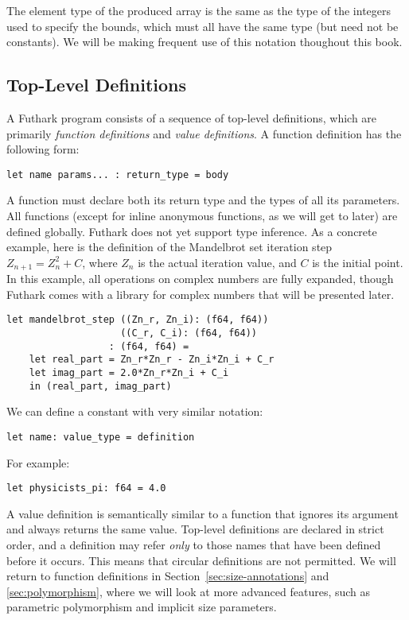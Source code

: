 \documentclass[oneside,11pt]{book}
\begin{document}
The element type of the produced array is the same as the type of the
integers used to specify the bounds, which must all have the same type
(but need not be constants).  We will be making frequent use of this
notation thoughout this book.

\subsection{Top-Level Definitions}
\label{sec:function-declarations}

A Futhark program consists of a sequence of top-level definitions,
which are primarily \textit{function definitions} and \textit{value
  definitions}.  A function definition has the following form:

\begin{lstlisting}
let name params... : return_type = body
\end{lstlisting}

\noindent
A function must declare both its return type and the types of all its
parameters.  All functions (except for inline anonymous functions, as
we will get to later) are defined globally.  Futhark does not yet
support type inference. As a concrete example, here is the definition
of the Mandelbrot set iteration step $Z_{n+1} = Z_{n}^{2} + C$, where
$Z_n$ is the actual iteration value, and $C$ is the initial point. In
this example, all operations on complex numbers are fully expanded,
though Futhark comes with a library for complex numbers that will be
presented later.

\begin{lstlisting}
let mandelbrot_step ((Zn_r, Zn_i): (f64, f64))
                    ((C_r, C_i): (f64, f64))
                  : (f64, f64) =
    let real_part = Zn_r*Zn_r - Zn_i*Zn_i + C_r
    let imag_part = 2.0*Zn_r*Zn_i + C_i
    in (real_part, imag_part)
\end{lstlisting}

We can define a constant with very similar notation:

\begin{lstlisting}
let name: value_type = definition
\end{lstlisting}

\noindent
For example:

\begin{lstlisting}
let physicists_pi: f64 = 4.0
\end{lstlisting}

A value definition is semantically similar to a function that ignores
its argument and always returns the same value.  Top-level definitions
are declared in strict order, and a definition may refer \textit{only}
to those names that have been defined before it occurs.  This means
that circular definitions are not permitted.  We will return to
function definitions in Section~\ref{sec:size-annotations} and
\ref{sec:polymorphism}, where we will look at more advanced features,
such as parametric polymorphism and implicit size parameters.
\end{document}
